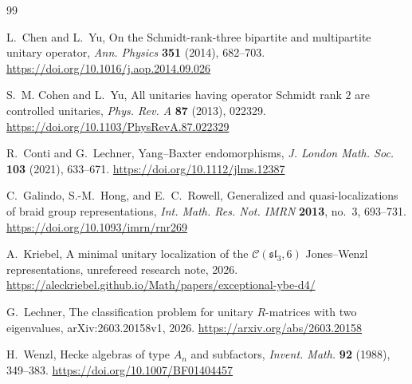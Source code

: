\documentclass[11pt]{article}
\theoremstyle{definition}
\theoremstyle{remark}
\newcommand{\cC}{\mathcal C}
\begin{document}
\begin{thebibliography}{99}

L.~Chen and L.~Yu,
\newblock On the Schmidt-rank-three bipartite and multipartite unitary
operator,
\newblock \emph{Ann. Physics} \textbf{351} (2014), 682--703.
\newblock \url{https://doi.org/10.1016/j.aop.2014.09.026}

S.~M. Cohen and L.~Yu,
\newblock All unitaries having operator Schmidt rank \(2\) are controlled
unitaries,
\newblock \emph{Phys. Rev. A} \textbf{87} (2013), 022329.
\newblock \url{https://doi.org/10.1103/PhysRevA.87.022329}

R.~Conti and G.~Lechner,
\newblock Yang--Baxter endomorphisms,
\newblock \emph{J. London Math. Soc.} \textbf{103} (2021), 633--671.
\newblock \url{https://doi.org/10.1112/jlms.12387}

C.~Galindo, S.-M.~Hong, and E.~C.~Rowell,
\newblock Generalized and quasi-localizations of braid group
representations,
\newblock \emph{Int. Math. Res. Not. IMRN} \textbf{2013}, no.~3,
693--731.
\newblock \url{https://doi.org/10.1093/imrn/rnr269}

A.~Kriebel,
\newblock A minimal unitary localization of the
\(\cC(\mathfrak{sl}_3,6)\) Jones--Wenzl representations,
\newblock unrefereed research note, 2026.
\newblock
\url{https://aleckriebel.github.io/Math/papers/exceptional-ybe-d4/}

G.~Lechner,
\newblock The classification problem for unitary \(R\)-matrices with two
eigenvalues,
\newblock arXiv:2603.20158v1, 2026.
\newblock \url{https://arxiv.org/abs/2603.20158}

H.~Wenzl,
\newblock Hecke algebras of type \(A_n\) and subfactors,
\newblock \emph{Invent. Math.} \textbf{92} (1988), 349--383.
\newblock \url{https://doi.org/10.1007/BF01404457}

\end{thebibliography}
\end{document}
